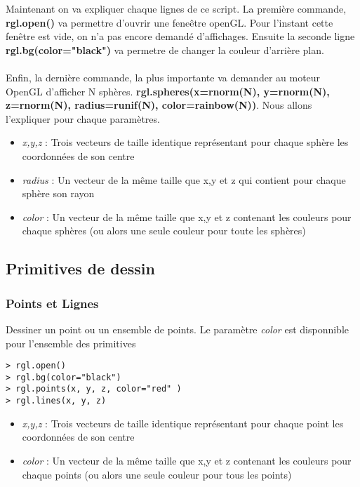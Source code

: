 Maintenant on va expliquer chaque lignes de ce script. La première commande, \textbf{rgl.open()} va permettre d'ouvrir une feneêtre openGL. Pour l'instant cette fenêtre est vide, on n'a pas encore demandé d'affichages. Ensuite la seconde ligne \textbf{rgl.bg(color="black")} va permetre de changer la couleur d'arrière plan. 
\\ \\
Enfin, la dernière commande, la plus importante va demander au moteur OpenGL d'afficher N sphères. \textbf{rgl.spheres(x=rnorm(N), y=rnorm(N), z=rnorm(N), radius=runif(N), color=rainbow(N))}. Nous allons l'expliquer pour chaque paramètres.
\begin{itemize}
\item \textit{x,y,z} : Trois vecteurs de taille identique représentant pour chaque sphère les coordonnées de son centre
\item \textit{radius} : Un vecteur de la même taille que x,y et z qui contient pour chaque sphère son rayon
\item \textit{color} : Un vecteur de la même taille que x,y et z contenant les couleurs pour chaque sphères (ou alors une seule couleur pour toute les sphères)
\end{itemize}

\newpage
\subsection{Primitives de dessin}

\subsubsection{Points et Lignes}
Dessiner un point ou un ensemble de points. Le paramètre \textit{color} est disponnible pour l'ensemble des primitives
\begin{lstlisting}
> rgl.open()
> rgl.bg(color="black")
> rgl.points(x, y, z, color="red" )
> rgl.lines(x, y, z)
\end{lstlisting}

\begin{itemize}
\item \textit{x,y,z} : Trois vecteurs de taille identique représentant pour chaque point les coordonnées de son centre
\item \textit{color} : Un vecteur de la même taille que x,y et z contenant les couleurs pour chaque points (ou alors une seule couleur pour tous les points)
\end{itemize}



